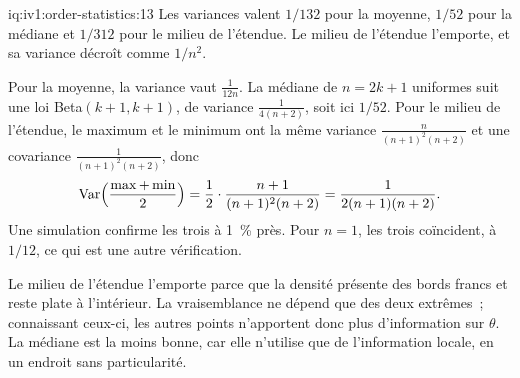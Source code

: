 \begin{solution}{iq:iv1:order-statistics:13}
Les variances valent $1/132$ pour la moyenne, $1/52$ pour la médiane et $1/312$ pour le milieu de l'étendue. Le milieu de l'étendue l'emporte, et sa variance décroît comme $1/n^2$.

Pour la moyenne, la variance vaut $\frac{1}{12n}$. La médiane de $n = 2k + 1$ uniformes suit une loi Beta$(k + 1, k + 1)$, de variance $\frac{1}{4(n + 2)}$, soit ici $1/52$. Pour le milieu de l'étendue, le maximum et le minimum ont la même variance $\frac{n}{(n + 1)^2(n + 2)}$ et une covariance $\frac{1}{(n + 1)^2(n + 2)}$, donc
\[
\mathrm{Var}\Bigl(\frac{\max + \min}{2}\Bigr) = \frac{1}{2} \cdot \frac{n + 1}{(n + 1)^2(n + 2)} = \frac{1}{2(n + 1)(n + 2)}.
\]
Une simulation confirme les trois à 1~\% près. Pour $n = 1$, les trois coïncident, à $1/12$, ce qui est une autre vérification.

Le milieu de l'étendue l'emporte parce que la densité présente des bords francs et reste plate à l'intérieur. La vraisemblance ne dépend que des deux extrêmes~; connaissant ceux-ci, les autres points n'apportent donc plus d'information sur $\theta$. La médiane est la moins bonne, car elle n'utilise que de l'information locale, en un endroit sans particularité.

\end{solution}

